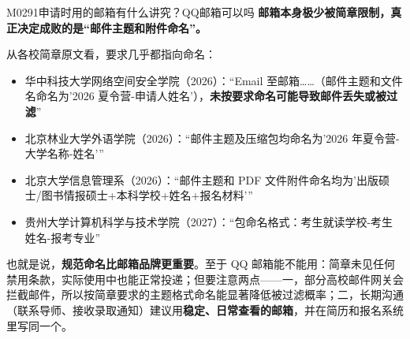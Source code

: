 \begin{qa}{M0291}{申请时用的邮箱有什么讲究？QQ邮箱可以吗}
\textbf{邮箱本身极少被简章限制，真正决定成败的是“邮件主题和附件命名”。}

从各校简章原文看，要求几乎都指向命名：

\begin{itemize}
  \item 华中科技大学网络空间安全学院（2026）：“Email 至邮箱……（邮件主题和文件名命名为'2026 夏令营-申请人姓名'），\textbf{未按要求命名可能导致邮件丢失或被过滤}”
  \item 北京林业大学外语学院（2026）：“邮件主题及压缩包均命名为'2026 年夏令营-大学名称-姓名'”
  \item 北京大学信息管理系（2026）：“邮件主题和 PDF 文件附件命名均为'出版硕士/图书情报硕士+本科学校+姓名+报名材料'”
  \item 贵州大学计算机科学与技术学院（2027）：“包命名格式：考生就读学校-考生姓名-报考专业”
\end{itemize}

也就是说，\textbf{规范命名比邮箱品牌更重要}。至于 QQ 邮箱能不能用：简章未见任何禁用条款，实际使用中也能正常投递；但要注意两点——一，部分高校邮件网关会拦截邮件，所以按简章要求的主题格式命名能显著降低被过滤概率；二，长期沟通（联系导师、接收录取通知）建议用\textbf{稳定、日常查看的邮箱}，并在简历和报名系统里写同一个。
\end{qa}

